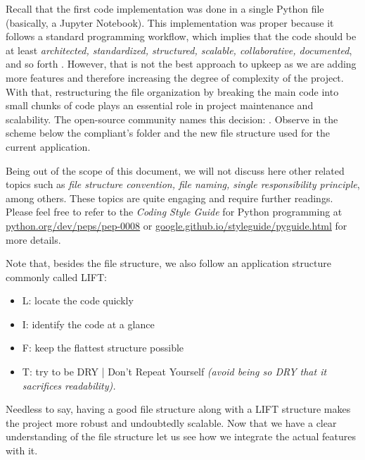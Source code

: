 Recall that the first code implementation was done in a single Python file (basically, a Jupyter Notebook). This implementation was proper because it follows a standard programming workflow, which implies that the code should be at least \textit{architected, standardized, structured, scalable, collaborative, documented}, and so forth \cite{rflorent2019veibm1, smashingmagazine}. However, that is not the best approach to upkeep as we are adding more features and therefore increasing the degree of complexity of the project. With that, restructuring the file organization by breaking the main code into small chunks of code plays an essential role in project maintenance and scalability. The open-source community names this decision: . Observe in the scheme below the compliant's folder and the new file structure used for the current application.



\noindent
Being out of the scope of this document, we will not discuss here other related topics such as \textit{file structure convention, file naming, single responsibility principle}, among others. These topics are quite engaging and require further readings. Please feel free to refer to the \emph{Coding Style Guide} for Python programming at \href{https://www.python.org/dev/peps/pep-0008/}{python.org/dev/peps/pep-0008} or \href{http://google.github.io/styleguide/pyguide.html}{google.github.io/styleguide/pyguide.html} for more details.

Note that, besides the file structure, we also follow an application structure commonly called LIFT:
\begin{itemize}
    \item L: locate the code quickly
    \item I: identify the code at a glance
    \item F: keep the flattest structure possible
    \item T: try to be DRY | Don't Repeat Yourself \textit{(avoid being so DRY that it sacrifices readability).}
\end{itemize}
\noindent
Needless to say, having a good file structure along with a LIFT structure makes the project more robust and undoubtedly scalable. Now that we have a clear understanding of the file structure let us see how we integrate the actual features with it.

